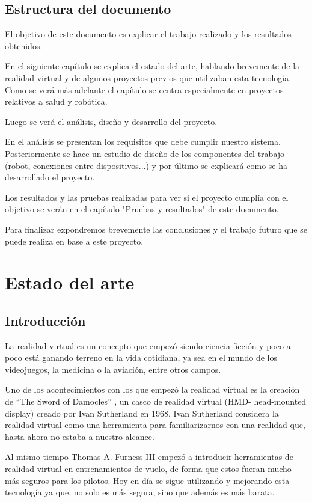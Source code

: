 \documentclass[twoside, 12pt]{epstfg}
\begin{document}
\newpage
\section{Estructura del documento}


El objetivo de este documento es explicar el trabajo realizado y los resultados obtenidos.

En el siguiente capítulo se explica el estado del arte, hablando brevemente de la realidad virtual y de algunos proyectos previos que utilizaban esta tecnología. Como se verá más adelante el capítulo se centra especialmente en proyectos relativos a salud y robótica.

Luego se verá el análisis, diseño y desarrollo del proyecto.

En el análisis se presentan los requisitos que debe cumplir nuestro sistema. Posteriormente se hace un estudio de diseño de los componentes del trabajo (robot, conexiones entre dispositivos...) y por último se explicará como se ha desarrollado el proyecto.

Los resultados y las pruebas realizadas para ver si el proyecto cumplía con el objetivo se verán en el capítulo "Pruebas y resultados" de este documento.

Para finalizar expondremos brevemente las conclusiones y el trabajo futuro que se puede realiza en base a este proyecto.

\chapter{Estado del arte}

\section{Introducción}
La realidad virtual es un concepto que empezó siendo ciencia ficción y poco a poco está ganando terreno en la vida cotidiana, ya sea en el mundo de los videojuegos, la medicina o la aviación, entre otros campos.

Uno de los  acontecimientos con los que empezó la realidad virtual es la creación de “The Sword of Damocles” , un casco de realidad virtual (HMD- head-mounted display)  creado por Ivan Sutherland en 1968. 
Ivan Sutherland considera la realidad virtual como una herramienta para familiarizarnos con una realidad que, hasta ahora no estaba a nuestro alcance.

Al mismo tiempo Thomas A. Furness III empezó a introducir herramientas de realidad virtual en entrenamientos de vuelo, de forma que estos fueran mucho más seguros para los pilotos. Hoy en día se sigue utilizando y mejorando esta tecnología ya que, no solo es más segura, sino que además es más barata.
\end{document}
